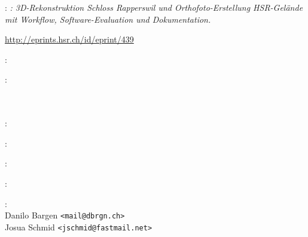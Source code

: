 
\thispagestyle{empty}

\hfill

\vfill

\noindent\myName: \textit{\myTitle: 3D-Rekonstruktion Schloss Rapperswil und
Orthofoto-Erstellung HSR-Gelände mit Workflow, Software-Evaluation und
Dokumentation.}
\textcopyright\ \myTime

\bigskip

\noindent \url{http://eprints.hsr.ch/id/eprint/439}

\bigskip

\noindent{}: \\
\myHackerspace

\medskip

\noindent{}: \\
\myUni \\
\myFaculty \\
\myProf

\medskip

\noindent{}: \\
\myLocation

\medskip

\noindent{}: \\
\myTime

\medskip

\noindent{}: \\
\myLicense

\medskip

\noindent{}: \\
\myRepo

\medskip

\noindent{}: \\
Danilo Bargen \texttt{<mail@dbrgn.ch>}\\
Josua Schmid \texttt{<jschmid@fastmail.net>}
